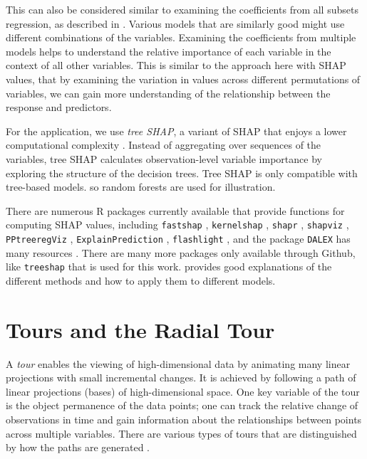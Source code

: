 \documentclass[
]{sn-jnl}
\begin{document}
This can also be considered similar to examining the coefficients from
all subsets regression, as described in
\citet{wickham_visualizing_2015}. Various models that are similarly good
might use different combinations of the variables. Examining the
coefficients from multiple models helps to understand the relative
importance of each variable in the context of all other variables. This
is similar to the approach here with SHAP values, that by examining the
variation in values across different permutations of variables, we can
gain more understanding of the relationship between the response and
predictors.

For the application, we use \emph{tree SHAP}, a variant of SHAP that
enjoys a lower computational complexity
\citep{lundberg_consistent_2018}. Instead of aggregating over sequences
of the variables, tree SHAP calculates observation-level variable
importance by exploring the structure of the decision trees. Tree SHAP
is only compatible with tree-based models. so random forests are used
for illustration.

There are numerous R packages currently available that provide functions
for computing SHAP values, including \texttt{fastshap} \citep{fastshap},
\texttt{kernelshap} \citep{kernelshap}, \texttt{shapr} \citep{shapr},
\texttt{shapviz} \citep{shapviz}, \texttt{PPtreeregViz}
\citep{PPtreeregViz}, \texttt{ExplainPrediction}
\citep{ExplainPrediction}, \texttt{flashlight} \citep{flashlight}, and
the package \texttt{DALEX} has many resources \citep{biecek_dalex_2018}.
There are many more packages only available through Github, like
\texttt{treeshap} \citep{kominsarczyk_treeshap_2021} that is used for
this work. \citet{molnar2022} provides good explanations of the
different methods and how to apply them to different models.

\hypertarget{sec:tour}{%
\section{Tours and the Radial Tour}\label{sec:tour}}

A \emph{tour} enables the viewing of high-dimensional data by animating
many linear projections with small incremental changes. It is achieved
by following a path of linear projections (bases) of high-dimensional
space. One key variable of the tour is the object permanence of the data
points; one can track the relative change of observations in time and
gain information about the relationships between points across multiple
variables. There are various types of tours that are distinguished by
how the paths are generated \citep{lee_state_2021, cook_grand_2008}.
\end{document}
